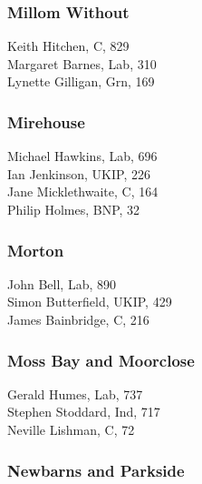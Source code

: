 \documentclass[a4paper,openany,10pt]{book}
\begin{document}
\subsubsection*{Millom Without}



Keith Hitchen, C, 829\\
Margaret Barnes, Lab, 310\\
Lynette Gilligan, Grn, 169\\


\subsubsection*{Mirehouse}



Michael Hawkins, Lab, 696\\
Ian Jenkinson, UKIP, 226\\
Jane Micklethwaite, C, 164\\
Philip Holmes, BNP, 32\\


\subsubsection*{Morton}



John Bell, Lab, 890\\
Simon Butterfield, UKIP, 429\\
James Bainbridge, C, 216\\


\subsubsection*{Moss Bay and Moorclose}



Gerald Humes, Lab, 737\\
Stephen Stoddard, Ind, 717\\
Neville Lishman, C, 72\\


\subsubsection*{Newbarns and Parkside}
\end{document}
